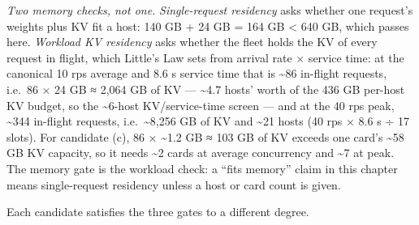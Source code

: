 \emph{Two memory checks, not one.} \emph{Single-request residency} asks
whether one request's weights plus KV fit a host: 140 GB + 24 GB = 164
GB \textless{} 640 GB, which passes here. \emph{Workload KV residency}
asks whether the fleet holds the KV of every request in flight, which
Little's Law sets from arrival rate × service time: at the canonical 10
rps average and 8.6 s service time that is \textasciitilde86 in-flight
requests, i.e.~86 × 24 GB ≈ 2,064 GB of KV --- \textasciitilde4.7 hosts'
worth of the 436 GB per-host KV budget, so the \textasciitilde6-host
KV/service-time screen --- and at the 40 rps peak, \textasciitilde344
in-flight requests, i.e.~\textasciitilde8,256 GB of KV and
\textasciitilde21 hosts (40 rps × 8.6 s ÷ 17 slots). For candidate (c),
86 × \textasciitilde1.2 GB ≈ 103 GB of KV exceeds one card's
\textasciitilde58 GB KV capacity, so it needs \textasciitilde2 cards at
average concurrency and \textasciitilde7 at peak. The memory gate is the
workload check: a ``fits memory'' claim in this chapter means
single-request residency unless a host or card count is given.

Each candidate satisfies the three gates to a different degree.

